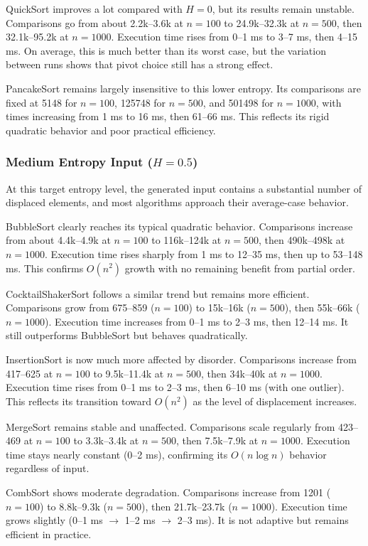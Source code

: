 \documentclass{article}
\begin{document}
QuickSort improves a lot compared with $H=0$, but its results remain unstable. Comparisons go from about 2.2k--3.6k at $n=100$ to 24.9k--32.3k at $n=500$, then 32.1k--95.2k at $n=1000$. Execution time rises from 0--1 ms to 3--7 ms, then 4--15 ms. On average, this is much better than its worst case, but the variation between runs shows that pivot choice still has a strong effect.

PancakeSort remains largely insensitive to this lower entropy. Its comparisons are fixed at 5148 for $n=100$, 125748 for $n=500$, and 501498 for $n=1000$, with times increasing from 1 ms to 16 ms, then 61--66 ms. This reflects its rigid quadratic behavior and poor practical efficiency.

\subsubsection{Medium Entropy Input ($H = 0.5$)}

At this target entropy level, the generated input contains a substantial number of displaced elements, and most algorithms approach their average-case behavior.

BubbleSort clearly reaches its typical quadratic behavior. Comparisons increase from about 4.4k--4.9k at $n=100$ to 116k--124k at $n=500$, then 490k--498k at $n=1000$. Execution time rises sharply from 1 ms to 12--35 ms, then up to 53--148 ms. This confirms $O(n^2)$ growth with no remaining benefit from partial order.

CocktailShakerSort follows a similar trend but remains more efficient. Comparisons grow from 675--859 ($n=100$) to 15k--16k ($n=500$), then 55k--66k ($n=1000$). Execution time increases from 0--1 ms to 2--3 ms, then 12--14 ms. It still outperforms BubbleSort but behaves quadratically.

InsertionSort is now much more affected by disorder. Comparisons increase from 417--625 at $n=100$ to 9.5k--11.4k at $n=500$, then 34k--40k at $n=1000$. Execution time rises from 0--1 ms to 2--3 ms, then 6--10 ms (with one outlier). This reflects its transition toward $O(n^2)$ as the level of displacement increases.

MergeSort remains stable and unaffected. Comparisons scale regularly from 423--469 at $n=100$ to 3.3k--3.4k at $n=500$, then 7.5k--7.9k at $n=1000$. Execution time stays nearly constant (0--2 ms), confirming its $O(n \log n)$ behavior regardless of input.

CombSort shows moderate degradation. Comparisons increase from 1201 ($n=100$) to 8.8k--9.3k ($n=500$), then 21.7k--23.7k ($n=1000$). Execution time grows slightly (0--1 ms $\rightarrow$ 1--2 ms $\rightarrow$ 2--3 ms). It is not adaptive but remains efficient in practice.
\end{document}
